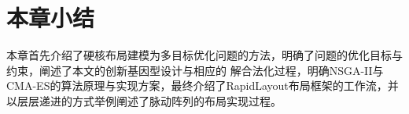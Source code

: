 













\section{本章小结}

本章首先介绍了硬核布局建模为多目标优化问题的方法，明确了问题的优化目标与约束，阐述了本文的创新基因型设计与相应的
解合法化过程，明确NSGA-II与CMA-ES的算法原理与实现方案，最终介绍了RapidLayout布局框架的工作流，并
以层层递进的方式举例阐述了脉动阵列的布局实现过程。

















































